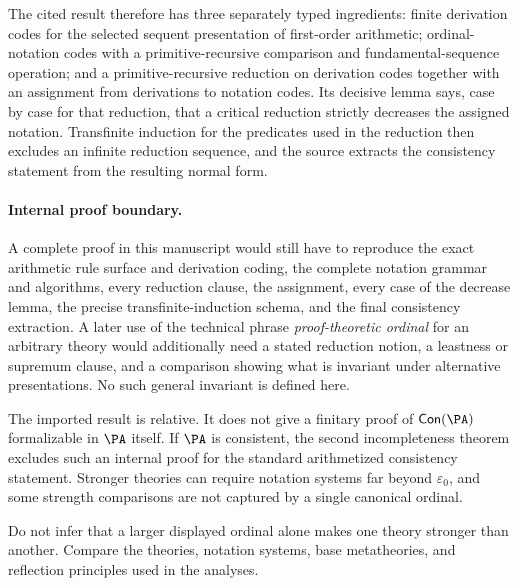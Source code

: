 The cited result therefore has three separately typed ingredients: finite
derivation codes for the selected sequent presentation of first-order
arithmetic; ordinal-notation codes with a primitive-recursive comparison and
fundamental-sequence operation; and a primitive-recursive reduction on
derivation codes together with an assignment from derivations to notation
codes.  Its decisive lemma says, case by case for that reduction, that a
critical reduction strictly decreases the assigned notation.  Transfinite
induction for the predicates used in the reduction then excludes an infinite
reduction sequence, and the source extracts the consistency statement from
the resulting normal form.

\paragraph{Internal proof boundary.}
A complete proof in this manuscript would still have to reproduce the exact
arithmetic rule surface and derivation coding, the complete notation grammar
and algorithms, every reduction clause, the assignment, every case of the
decrease lemma, the precise transfinite-induction schema, and the final
consistency extraction.  A later use of the technical phrase
\emph{proof-theoretic ordinal} for an arbitrary theory would additionally need
a stated reduction notion, a leastness or supremum clause, and a comparison
showing what is invariant under alternative presentations.  No such general
invariant is defined here.

The imported result is relative.  It does not give a finitary proof of
\(\mathsf{Con}(\PA)\) formalizable in \(\PA\) itself.  If \(\PA\) is
consistent, the second incompleteness theorem excludes such an internal proof
for the standard arithmetized consistency statement.  Stronger theories can
require notation systems far beyond \(\varepsilon_0\), and some strength
comparisons are not captured by a single canonical ordinal.

\begin{warning}
Do not infer that a larger displayed ordinal alone makes one theory stronger
than another.  Compare the theories, notation systems, base metatheories, and
reflection principles used in the analyses.
\end{warning}

